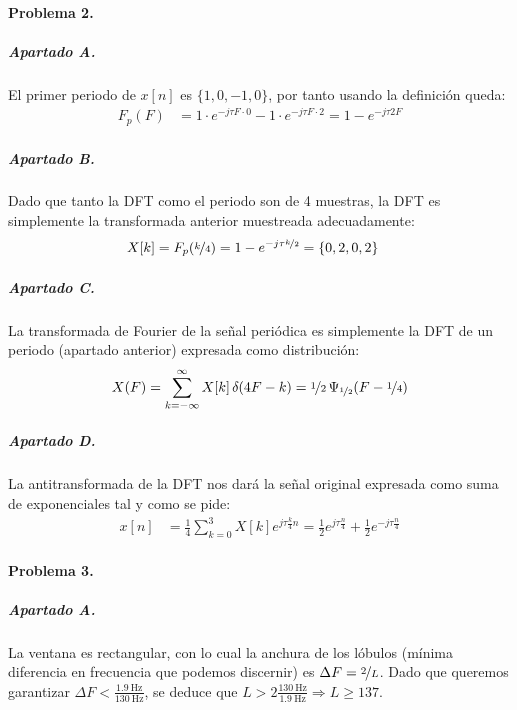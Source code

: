 \paragraph{Problema 2.}

\subparagraph{Apartado A.}

El primer periodo de $x[n]$ es $\{ 1, 0, -1, 0 \}$, por tanto usando la
definición queda:
%
\begin{align*}
  F_p(F) &= 1\cdot e^{-j\tau F \cdot 0} -1\cdot e^{-j\tau F \cdot 2}
    = 1 - e^{-j\tau 2 F}
\end{align*}

\subparagraph{Apartado B.}

Dado que tanto la DFT como el periodo son de 4 muestras, la DFT es simplemente
la transformada anterior muestreada adecuadamente:
%
\begin{align*}
  X[k] &= F_p( \nicefrac{k}{4} ) = 1 - e^{-j\tau \nicefrac{k}{2}} =
    \{ 0, 2, 0, 2 \}
\end{align*}

\subparagraph{Apartado C.}

La transformada de Fourier de la señal periódica es simplemente la DFT
de un periodo (apartado anterior) expresada como distribución:
%
\begin{align*}
  X(F) = \sum_{k = -\infty}^{\infty} X[k] \,
    \delta\hspace{-.2em}\left(4F - k\right)
    = \nicefrac{1}{2} \, \Psi_{\nicefrac{1}{2}}(F - \nicefrac{1}{4})
\end{align*}

\subparagraph{Apartado D.}

La antitransformada de la DFT nos dará la señal original expresada como suma
de exponenciales tal y como se pide:
%
\begin{align*}
  x[n] &= \frac{1}{4} \sum_{k = 0}^{3} X[k] e^{j\tau \frac{k}{4} n}
    = \frac{1}{2} e^{j\tau \frac{n}{4}}
    + \frac{1}{2} e^{-j\tau \frac{n}{4}}
\end{align*}

\finishpage
\startpage

\paragraph{Problema 3.}

\subparagraph{Apartado A.}

La ventana es rectangular, con lo cual la anchura de los lóbulos (mínima
diferencia en frecuencia que podemos discernir) es $\Delta F = \nicefrac{2}{L}$.
Dado que queremos garantizar $\Delta F < \frac{\SI{1.9}{\hertz}}
{\SI{130}{\hertz}}$, se deduce que $L >
2\frac{\SI{130}{\hertz}}{\SI{1.9}{\hertz}} \Rightarrow L \geq \num{137}$.

